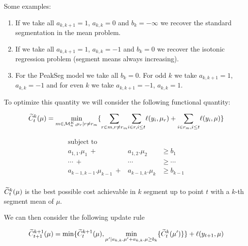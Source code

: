 \documentclass{article}
\begin{document}
Some examples:
\begin{enumerate}
\item If we take all $a_{k,k+1} =1$, $a_{k,k}=0$ and $b_{k} = - \infty$ we recover the standard segmentation in the mean problem.
\item If we take all $a_{k,k+1} =1$, $a_{k,k}=-1$ and $b_{k} = 0$ we
  recover the isotonic regression problem (segment means always
  increasing).
\item For the PeakSeg model we take all $b_{k} = 0$. For odd $k$ we
  take $a_{k,k+1} =1$, $a_{k,k}=-1$ and for even $k$ we take
  $a_{k,k+1} =-1$, $a_{k,k}=1$.
\end{enumerate}

To optimize this quantity we will consider the following functional quantity:

\begin{equation}
\widetilde{C}^k_t(\mu) =  \underset{m \in \mathcal{M}^K_n, \mu_r |  r \neq r_m}{\min} 
		\{ 
		   \underset{r \in m, r \neq r_m}{\sum} 
		   \underset{i \in r, i \leq t  }{\sum} \ell(y_i, \mu_{r}) 
		+ 
		   \underset{i \in r_m, i \leq t}{\sum} \ell(y_i, \mu)
		\}  
\end{equation}



\begin{eqnarray*}
\text{subject to} \\
a_{1,1}. \mu_1 \ + & a_{1,2}. \mu_2  & \geq  b_1 \\
\cdots \ + & \cdots & \geq \cdots \\
a_{k-1,k-1}. \mu_{k-1} \ + &a_{k-1,k}. \mu_{k}  & \geq  b_{k-1} \\
\end{eqnarray*}

$\widetilde{C}^k_t(\mu)$ is the best possible cost achievable in $k$ segment up to point $t$ with a $k$-th
segment mean of $\mu$.

We can then consider the following update rule

\begin{equation}
\widetilde{C}^{k+1}_{t+1}(\mu) = \min \{ \widetilde{C}^{k+1}_{t}(\mu)  , \underset{\mu' | a_{k,k}. \mu' + a_{k,k}. \mu  \geq  b_{k}}{\min} \{ \widetilde{C}^{k}_{t}(\mu') \}  \} + \ell(y_{t+1}, \mu)
\label{update}
\end{equation}
\end{document}

